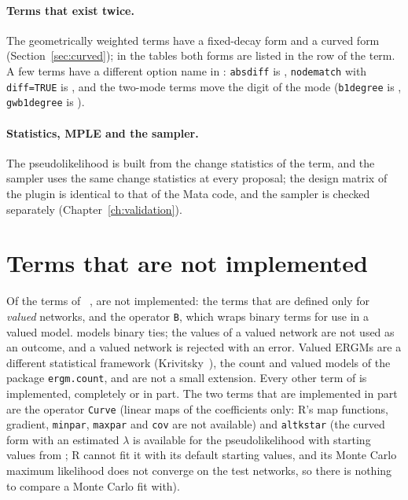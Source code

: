 \paragraph{Terms that exist twice.} The geometrically weighted terms have a fixed-decay form and a curved form (Section~\ref{sec:curved}); in the tables both forms are listed in the row of the \ergm{} term. A few \ergm{} terms have a different option name in \nwergm{}: \texttt{absdiff} is , \texttt{nodematch} with \texttt{diff=TRUE} is , and the two-mode terms move the digit of the mode (\texttt{b1degree} is , \texttt{gwb1degree} is ).

\paragraph{Statistics, MPLE and the sampler.} The pseudolikelihood is built from the change statistics of the term, and the sampler uses the same change statistics at every proposal; the design matrix of the plugin is identical to that of the Mata code, and the sampler is checked separately (Chapter~\ref{ch:validation}).



\section{Terms that are not implemented}\label{sec:notimpl}

Of the \nErgm{} terms of \ergm{}~\ergmver{}, \nNotPlanned{} are not implemented: the \nValued{} terms that are defined only for \emph{valued} networks, and the operator \texttt{B}, which wraps binary terms for use in a valued model. \nwergm{} models binary ties; the values of a valued network are not used as an outcome, and a valued network is rejected with an error. Valued ERGMs are a different statistical framework (Krivitsky~\cite{krivitsky2012}), the count and valued models of the package \texttt{ergm.count}, and are not a small extension. Every other term of \ergm{} is implemented, completely or in part. The two terms that are implemented in part are the operator \texttt{Curve} (linear maps of the coefficients only: R's map functions, gradient, \texttt{minpar}, \texttt{maxpar} and \texttt{cov} are not available) and \texttt{altkstar} (the curved form with an estimated $\lambda$ is available for the pseudolikelihood with starting values from ; R cannot fit it with its default starting values, and its Monte Carlo maximum likelihood does not converge on the test networks, so there is nothing to compare a Monte Carlo fit with).


